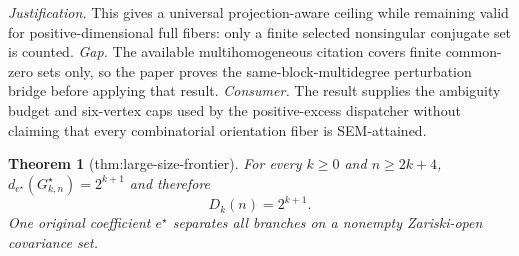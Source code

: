 \documentclass{article}
\newtheorem{theorem}{Theorem}
\begin{document}
\par\smallskip\noindent \textit{Justification.} This gives a universal projection-aware ceiling while remaining valid for positive-dimensional full fibers: only a finite selected nonsingular conjugate set is counted. \textit{Gap.} The available multihomogeneous citation covers finite common-zero sets only, so the paper proves the same-block-multidegree perturbation bridge before applying that result. \textit{Consumer.} The result supplies the ambiguity budget and six-vertex caps used by the positive-excess dispatcher without claiming that every combinatorial orientation fiber is SEM-attained.

\begin{theorem}[thm:large-size-frontier]\label{thm:large-size-frontier}
For every \(k\ge0\) and \(n\ge2k+4\), \(d_{e^{\star}}(G^{\star}_{k,n})=2^{k+1}\) and therefore \[D_k(n)=2^{k+1}.\] One original coefficient \(e^{\star}\) separates all branches on a nonempty Zariski-open covariance set.
\end{theorem}
\end{document}
